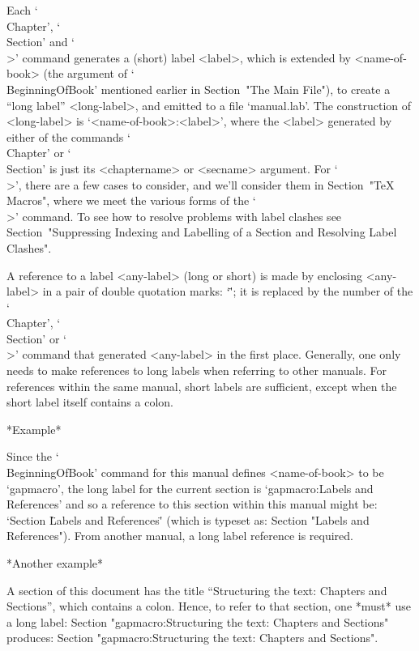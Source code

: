 Each `\\Chapter', `\\Section' and `\\>' command generates a (short) label
<label>,  which  is  extended  by   <name-of-book>   (the   argument   of
`\\BeginningOfBook' mentioned earlier in  Section~"The  Main  File"),  to
create a ``long label'' <long-label>, and emitted to a file `manual.lab'.
The construction of <long-label> is `<name-of-book>:<label>',  where  the
<label> generated by either of the commands `\\Chapter' or `\\Section' is
just its <chaptername> or <secname> argument. For `\\>', there are a  few
cases to consider, and we'll consider them in Section~"TeX Macros", where
we meet the various forms of the `\\>' command. To  see  how  to  resolve
problems  with  label  clashes  see  Section~"Suppressing  Indexing   and
Labelling of a Section and Resolving Label Clashes".

A reference to a label <any-label> (long or short) is made  by  enclosing
<any-label> in a pair of double quotation marks: `\"<any-label>\"'; it is
replaced by the number of the `\\Chapter', `\\Section' or  `\\>'  command
that generated <any-label> in the first place. Generally, one only  needs
to make references to long labels when referring to  other  manuals.  For
references within the same manual, short labels  are  sufficient,  except
when the short label itself contains a colon.

*Example*

Since  the  `\\BeginningOfBook'   command   for   this   manual   defines
<name-of-book> to be `gapmacro',
the long label for  the  current  section  is
`gapmacro:Labels and References'
and so a reference  to  this  section  within
this manual might be:  `Section  \"Labels  and  References\"'  (which  is
typeset as: Section "Labels and References"). From another manual, a long
label reference is required.

*Another example*

A section of this document has the title
``Structuring the text: Chapters and Sections'',
which contains a colon. Hence, to refer to that section, one *must* use a
long label:
\begintt
Section "gapmacro:Structuring the text: Chapters and Sections"
\endtt
produces: Section "gapmacro:Structuring the text: Chapters and Sections".

